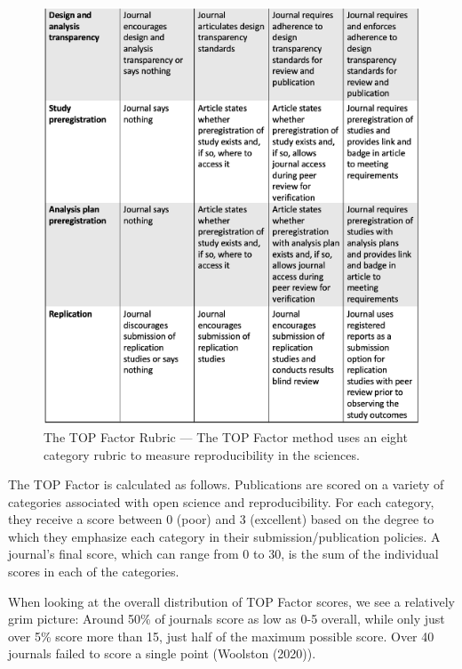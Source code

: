 \documentclass[12pt,twoside]{reedthesis}
\begin{document}
\begin{figure}

{\centering \includegraphics[width=1\linewidth]{figure/top-2} 

}

\caption{The TOP Factor Rubric --- The TOP Factor method uses an eight category rubric to measure reproducibility in the sciences.}\label{fig:top-factor2}
\end{figure}
The TOP Factor is calculated as follows. Publications are scored on a variety of categories associated with open science and reproducibility. For each category, they receive a score between 0 (poor) and 3 (excellent) based on the degree to which they emphasize each category in their submission/publication policies. A journal's final score, which can range from 0 to 30, is the sum of the individual scores in each of the categories.

When looking at the overall distribution of TOP Factor scores, we see a relatively grim picture: Around 50\% of journals score as low as 0-5 overall, while only just over 5\% score more than 15, just half of the maximum possible score. Over 40 journals failed to score a single point (Woolston (2020)).
\end{document}
